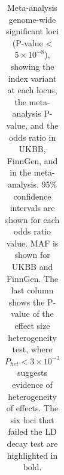     \begin{table}[H]

      \centering

      \caption[Genome-wide significant index variants from the UKBB and FinnGen pAD GWAS meta-analysis]{\label{tab:table:meta_gws}Meta-analysis genome-wide significant loci (P-value < $5\times10^{-8}$), showing the index variant at each locus, the meta-analysis P-value, and the odds ratio in UKBB, FinnGen, and in the meta-analysis. 95\% confidence intervals are shown for each odds ratio value. MAF is shown for UKBB and FinnGen. The last column shows the P-value of the effect size heterogeneity test, where $P_{het} < 3\times10^{-3}$ suggests evidence of heterogeneity of effects. The six loci that failed the LD decay test are highlighted in bold.}
      \fontsize{8.5}{11}\selectfont
      \begin{adjustwidth}{-.1in}{-.5in}  

      \begin{tabular}[t]{p{}llllp{}p{}p{}}


\end{tabular}
\end{adjustwidth}
\end{table}
